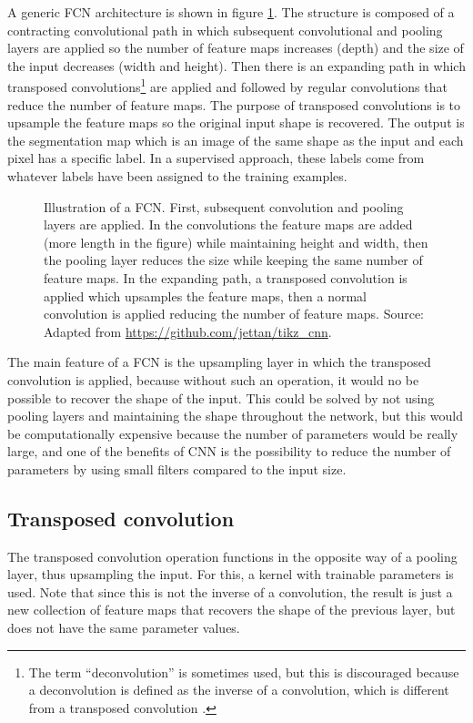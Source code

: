 A generic FCN architecture is shown in figure \ref{fig:fcn}. The structure is composed of a contracting convolutional path in which subsequent convolutional and pooling layers are applied so the number of feature maps increases (depth) and the size of the input decreases (width and height). Then there is an expanding path in which transposed convolutions\footnote{The term “deconvolution” is sometimes used, but this is discouraged because a deconvolution is defined as the inverse of a convolution, which is different from a transposed convolution \cite{trans-conv}.} are applied and followed by regular convolutions that reduce the number of feature maps. The purpose of transposed convolutions is to upsample the feature maps so the original input shape is recovered. The output is the segmentation map which is an image of the same shape as the input and each pixel has a specific label. In a supervised approach, these labels come from whatever labels have been assigned to the training examples. 

\begin{figure}
	\centering
	\noindent\resizebox{\textwidth}{!}{
	
	}
	\caption[Illustration of a fully convolutional network]{Illustration of a FCN. First, subsequent convolution and pooling layers are applied. In the convolutions the feature maps are added (more length in the figure) while maintaining height and width, then the pooling layer reduces the size while keeping the same number of feature maps. In the expanding path, a transposed convolution is applied which upsamples the feature maps, then a normal convolution is applied reducing the number of feature maps. Source: Adapted from \url{https://github.com/jettan/tikz_cnn}.}
	\label{fig:fcn}
\end{figure}

The main feature of a FCN is the upsampling layer in which the transposed convolution is applied, because without such an operation, it would no be possible to recover the shape of the input. This could be solved by not using pooling layers and maintaining the shape throughout the network, but this would be computationally expensive because the number of parameters would be really large, and one of the benefits of CNN is the possibility to reduce the number of parameters by using small filters compared to the input size.

\subsection{Transposed convolution}
The transposed convolution operation functions in the opposite way of a pooling layer, thus upsampling the input. For this, a kernel with trainable parameters is used. Note that since this is not the inverse of a convolution, the result is just a new collection of feature maps that recovers the shape of the previous layer, but does not have the same parameter values.

